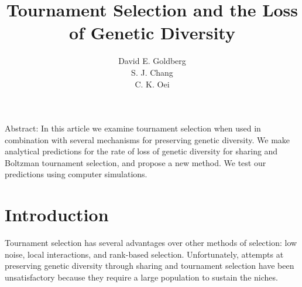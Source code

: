 
\title{Tournament Selection and the Loss of Genetic Diversity}
\author{David E. Goldberg\\S. J. Chang\\C. K. Oei}

\maketitle


{\noindent\narrower
Abstract:
In this article we examine tournament selection when used in combination with
several
mechanisms for preserving genetic diversity.  We make analytical predictions
for the rate of loss of genetic diversity for sharing and Boltzman tournament
selection, and propose a new method.  We test our predictions using computer
simulations.
}

\section{Introduction}
Tournament selection has several advantages over other methods of selection:
low noise, local interactions, and rank-based selection.  Unfortunately,
attempts at preserving genetic diversity through sharing and tournament
selection have been unsatisfactory because they require a large population to
sustain the niches.

